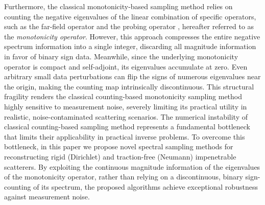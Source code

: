 \documentclass[11pt,reqno,twoside]{amsart}
\theoremstyle{definition}
\theoremstyle{remark}
\numberwithin{equation}{section}
\begin{document}
Furthermore, the classical monotonicity-based sampling method relies on counting the negative eigenvalues of the linear combination of specific operators, such as the far-field operator and the probing operator \cite{AG20, AG23}, hereafter referred to as the \emph{monotonicity operator}.  However, this approach  compresses the entire negative spectrum information into a single integer, discarding all magnitude information in favor of binary sign data. Meanwhile, since the underlying monotonicity operator is compact and self-adjoint, its eigenvalues accumulate at zero. Even arbitrary small data perturbations can flip the signs of numerous eigenvalues near the origin, making the counting map intrinsically discontinuous. This structural fragility renders the classical counting-based monotonicity sampling method highly sensitive to measurement noise, severely limiting its practical utility in realistic, noise-contaminated scattering scenarios. The numerical instability of classical counting-based sampling method represents a fundamental bottleneck that limits their applicability in practical inverse problems. To overcome this bottleneck, in this paper we propose novel spectral sampling methods for reconstructing rigid (Dirichlet) and traction-free (Neumann) impenetrable scatterers. By exploiting the continuous magnitude information of the eigenvalues of the monotonicity operator, rather than relying on a discontinuous, binary sign-counting of its spectrum, the proposed algorithms achieve exceptional robustness against measurement noise.
\end{document}
